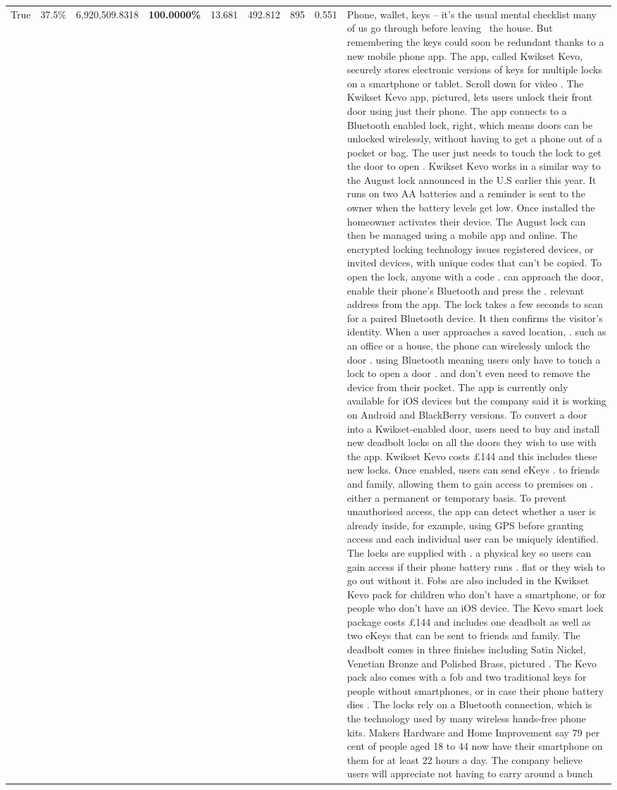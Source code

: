 \begin{table}[H]
\begin{tabular}{lllrlllll}
True & 37.5\% & 6,920,509.8318 & \bfseries \color{red} 100.0000\% & 13.681 & 492.812 & 895 & 0.551 & Phone, wallet, keys – it’s the usual mental checklist many of us go through before leaving  the house. But remembering the keys could soon be redundant thanks to a new mobile phone app. The app, called Kwikset Kevo, securely stores electronic versions of keys for multiple locks on a smartphone or tablet. Scroll down for video . The Kwikset Kevo app, pictured, lets users unlock their front door using just their phone. The app connects to a Bluetooth enabled lock, right, which means doors can be unlocked wirelessly, without having to get a phone out of a pocket or bag. The user just needs to touch the lock to get the door to open . Kwikset Kevo works in a similar way to the August lock announced in the U.S earlier this year. It runs on two AA batteries and a reminder is sent to the owner when the battery levels get low. Once installed the homeowner activates their device. The August lock can then be managed using a mobile app and online. The encrypted locking technology issues registered devices, or invited devices, with unique codes that can't be copied. To open the lock, anyone with a code . can approach the door, enable their phone's Bluetooth and press the . relevant address from the app. The lock takes a few seconds to scan for a paired Bluetooth device. It then confirms the visitor's identity. When a user approaches a saved location, . such as an office or a house, the phone can wirelessly unlock the door . using Bluetooth meaning users only have to touch a lock to open a door . and don't even need to remove the device from their pocket. The app is currently only available for iOS devices but the company said it is working on Android and BlackBerry versions. To convert a door into a Kwikset-enabled door, users need to buy and install new deadbolt locks on all the doors they wish to use with the app. Kwikset Kevo costs £144 and this includes these new locks. Once enabled, users can send eKeys . to friends and family, allowing them to gain access to premises on . either a permanent or temporary basis. To prevent unauthorised access, the app can detect whether a user is already inside, for example, using GPS before granting access and each individual user can be uniquely identified. The locks are supplied with . a physical key so users can gain access if their phone battery runs . flat or they wish to go out without it. Fobs are also included in the Kwikset Kevo pack for children who don't have a smartphone, or for people who don't have an iOS device. The Kevo smart lock package costs £144 and includes one deadbolt as well as two eKeys that can be sent to friends and family. The deadbolt comes in three finishes including Satin Nickel, Venetian Bronze and Polished Brass, pictured . The Kevo pack also comes with a fob and two traditional keys for people without smartphones, or in case their phone battery dies . The locks rely on a Bluetooth connection, which is the technology used by many wireless hands-free phone kits. Makers Hardware and Home Improvement say 79 per cent of people aged 18 to 44 now have their smartphone on them for at least 22 hours a day. The company believe users will appreciate not having to carry around a bunch 
\end{tabular}
\end{table}
